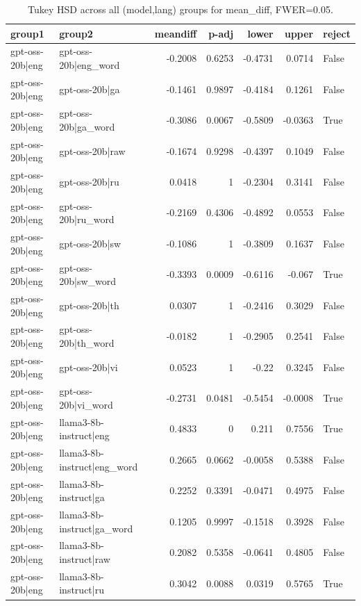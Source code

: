 \begin{table}
\caption{Tukey HSD across all (model,lang) groups for mean_diff, FWER=0.05.}
\label{tab:tukey_all_models_all_langs_mean_diff}
\begin{tabular}{l l r r r r l}
\toprule
group1 & group2 & meandiff & p-adj & lower & upper & reject \\
\midrule
gpt-oss-20b|eng & gpt-oss-20b|eng_word & -0.2008 & 0.6253 & -0.4731 & 0.0714 & False \\
gpt-oss-20b|eng & gpt-oss-20b|ga & -0.1461 & 0.9897 & -0.4184 & 0.1261 & False \\
gpt-oss-20b|eng & gpt-oss-20b|ga_word & -0.3086 & 0.0067 & -0.5809 & -0.0363 & True \\
gpt-oss-20b|eng & gpt-oss-20b|raw & -0.1674 & 0.9298 & -0.4397 & 0.1049 & False \\
gpt-oss-20b|eng & gpt-oss-20b|ru & 0.0418 & 1 & -0.2304 & 0.3141 & False \\
gpt-oss-20b|eng & gpt-oss-20b|ru_word & -0.2169 & 0.4306 & -0.4892 & 0.0553 & False \\
gpt-oss-20b|eng & gpt-oss-20b|sw & -0.1086 & 1 & -0.3809 & 0.1637 & False \\
gpt-oss-20b|eng & gpt-oss-20b|sw_word & -0.3393 & 0.0009 & -0.6116 & -0.067 & True \\
gpt-oss-20b|eng & gpt-oss-20b|th & 0.0307 & 1 & -0.2416 & 0.3029 & False \\
gpt-oss-20b|eng & gpt-oss-20b|th_word & -0.0182 & 1 & -0.2905 & 0.2541 & False \\
gpt-oss-20b|eng & gpt-oss-20b|vi & 0.0523 & 1 & -0.22 & 0.3245 & False \\
gpt-oss-20b|eng & gpt-oss-20b|vi_word & -0.2731 & 0.0481 & -0.5454 & -0.0008 & True \\
gpt-oss-20b|eng & llama3-8b-instruct|eng & 0.4833 & 0 & 0.211 & 0.7556 & True \\
gpt-oss-20b|eng & llama3-8b-instruct|eng_word & 0.2665 & 0.0662 & -0.0058 & 0.5388 & False \\
gpt-oss-20b|eng & llama3-8b-instruct|ga & 0.2252 & 0.3391 & -0.0471 & 0.4975 & False \\
gpt-oss-20b|eng & llama3-8b-instruct|ga_word & 0.1205 & 0.9997 & -0.1518 & 0.3928 & False \\
gpt-oss-20b|eng & llama3-8b-instruct|raw & 0.2082 & 0.5358 & -0.0641 & 0.4805 & False \\
gpt-oss-20b|eng & llama3-8b-instruct|ru & 0.3042 & 0.0088 & 0.0319 & 0.5765 & True \\

\end{tabular}
\end{table}
